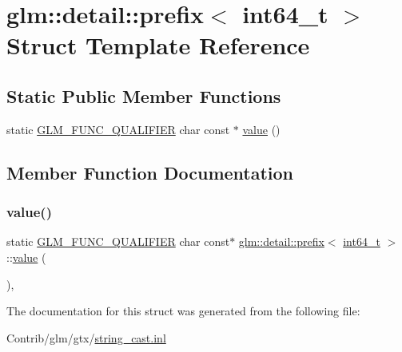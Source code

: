 \hypertarget{structglm_1_1detail_1_1prefix_3_01int64__t_01_4}{}\section{glm\+:\+:detail\+:\+:prefix$<$ int64\+\_\+t $>$ Struct Template Reference}
\label{structglm_1_1detail_1_1prefix_3_01int64__t_01_4}
\subsection*{Static Public Member Functions}
\begin{DoxyCompactItemize}
\item 
static \mbox{\hyperlink{setup_8hpp_a33fdea6f91c5f834105f7415e2a64407}{G\+L\+M\+\_\+\+F\+U\+N\+C\+\_\+\+Q\+U\+A\+L\+I\+F\+I\+ER}} char const  $\ast$ \mbox{\hyperlink{structglm_1_1detail_1_1prefix_3_01int64__t_01_4_a845043fc18700790972ca73ebc80ac4d}{value}} ()
\end{DoxyCompactItemize}


\subsection{Member Function Documentation}
\mbox{\label{structglm_1_1detail_1_1prefix_3_01int64__t_01_4_a845043fc18700790972ca73ebc80ac4d}} 
\subsubsection{\texorpdfstring{value()}{value()}}
{\footnotesize\ttfamily static \mbox{\hyperlink{setup_8hpp_a33fdea6f91c5f834105f7415e2a64407}{G\+L\+M\+\_\+\+F\+U\+N\+C\+\_\+\+Q\+U\+A\+L\+I\+F\+I\+ER}} char const$\ast$ \mbox{\hyperlink{structglm_1_1detail_1_1prefix}{glm\+::detail\+::prefix}}$<$ \mbox{\hyperlink{group__gtc__type__precision_ga6abb23fbf4e39c50ec5341160b5da5ab}{int64\+\_\+t}} $>$\+::\mbox{\hyperlink{_s_d_l__opengl__glext_8h_a8ad81492d410ff2ac11f754f4042150f}{value}} (\begin{DoxyParamCaption}{ }\end{DoxyParamCaption})\hspace{0.3cm}{\ttfamily [inline]}, {\ttfamily [static]}}



The documentation for this struct was generated from the following file\+:\begin{DoxyCompactItemize}
\item 
Contrib/glm/gtx/\mbox{\hyperlink{string__cast_8inl}{string\+\_\+cast.\+inl}}\end{DoxyCompactItemize}
